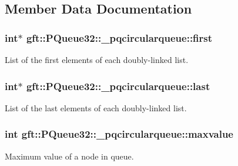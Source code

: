 \subsection{Member Data Documentation}
\hypertarget{structgft_1_1PQueue32_1_1__pqcircularqueue_abdbbf105caf80766f51fbc271d794ccb}{
\subsubsection[{first}]{\setlength{\rightskip}{0pt plus 5cm}int$\ast$ gft\-::\-P\-Queue32\-::\-\_\-pqcircularqueue\-::first}}\label{structgft_1_1PQueue32_1_1__pqcircularqueue_abdbbf105caf80766f51fbc271d794ccb}


List of the first elements of each doubly-\/linked list. 

\hypertarget{structgft_1_1PQueue32_1_1__pqcircularqueue_a9d495d213b910328120e4ed127dcbaec}{
\subsubsection[{last}]{\setlength{\rightskip}{0pt plus 5cm}int$\ast$ gft\-::\-P\-Queue32\-::\-\_\-pqcircularqueue\-::last}}\label{structgft_1_1PQueue32_1_1__pqcircularqueue_a9d495d213b910328120e4ed127dcbaec}


List of the last elements of each doubly-\/linked list. 

\hypertarget{structgft_1_1PQueue32_1_1__pqcircularqueue_a48f348ed1f639dd4970aa5f35feb81e0}{
\subsubsection[{maxvalue}]{\setlength{\rightskip}{0pt plus 5cm}int gft\-::\-P\-Queue32\-::\-\_\-pqcircularqueue\-::maxvalue}}\label{structgft_1_1PQueue32_1_1__pqcircularqueue_a48f348ed1f639dd4970aa5f35feb81e0}


Maximum value of a node in queue. 

